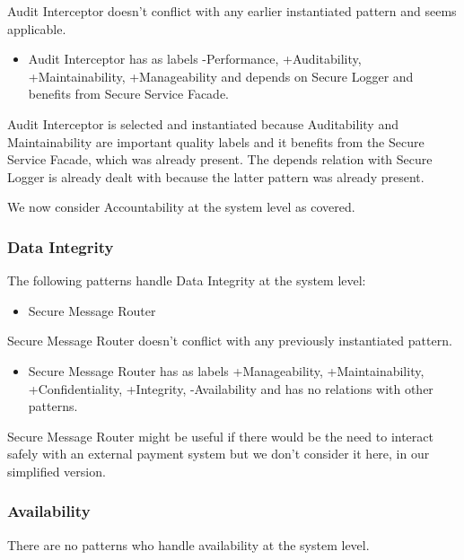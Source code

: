 \documentclass[a4paper,11pt]{report}
\begin{document}
Audit Interceptor doesn't conflict with any earlier instantiated pattern and seems applicable.

\begin{itemize}
\item Audit Interceptor has as labels -Performance, +Auditability, +Maintainability, +Manageability and depends on
Secure Logger and benefits from Secure Service Facade.
\end{itemize}

Audit Interceptor is selected and instantiated because Auditability and Maintainability are important quality
labels and it benefits from the Secure Service Facade, which was already present. The depends relation with
Secure Logger is already dealt with because the latter pattern was already present.

We now consider Accountability at the system level as covered.

\subsubsection{Data Integrity}
The following patterns handle Data Integrity at the system level:
\begin{itemize}
\item Secure Message Router
\end{itemize}

Secure Message Router doesn't conflict with any previously instantiated pattern.

\begin{itemize}
\item Secure Message Router has as labels +Manageability, +Maintainability, +Confidentiality, +Integrity, -Availability
and has no relations with other patterns.
\end{itemize}

Secure Message Router might be useful if there would be the need to interact safely with an external payment system
but we don't consider it here, in our simplified version.
\subsubsection{Availability}
There are no patterns who handle availability at the system level.
\end{document}

